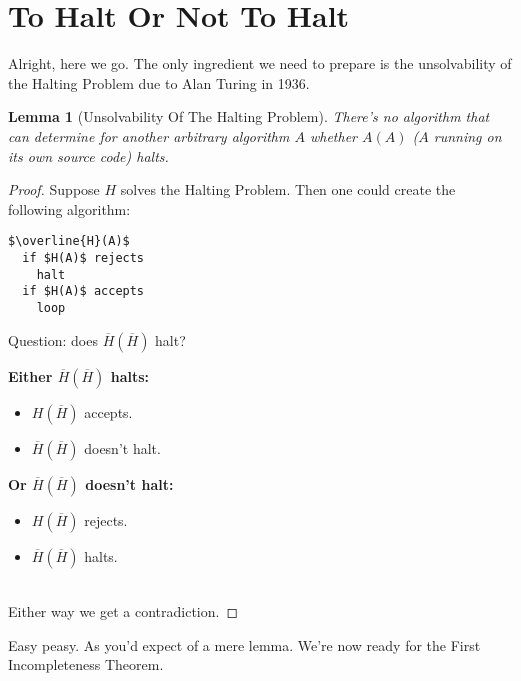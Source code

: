 \documentclass{article}
\theoremstyle{theorem}
\newtheorem{lemma}{Lemma}
\newcommand{\nameditem}[1]{\item\textbf{#1}}
\newcommand{\impl}{\item[$\Rightarrow$]}
\begin{document}
\section{To Halt Or Not To Halt}

Alright, here we go. The only ingredient we need to prepare is the unsolvability of the Halting Problem due to Alan Turing in 1936.

\begin{lemma}[Unsolvability Of The Halting Problem]
There's no algorithm that can determine for another arbitrary algorithm $A$ whether $A(A)$ ($A$ running on its own source code) halts.
\end{lemma}

\begin{proof}
Suppose $H$ solves the Halting Problem. Then one could create the following algorithm:\\[0.5em]
\begin{minipage}{\linewidth}
\begin{lstlisting}
$\overline{H}(A)$
  if $H(A)$ rejects
    halt
  if $H(A)$ accepts
    loop
\end{lstlisting}
\end{minipage}
Question: does $\overline{H}(\overline{H})$ halt?\\[0.5em]
\begin{minipage}{0.5\textwidth}
\begin{description}[noitemsep]
\nameditem{Either $\overline{H}(\overline{H})$ halts:} 
\begin{itemize}[noitemsep]
\impl $H(\overline{H})$ accepts.
\impl $\overline{H}(\overline{H})$ doesn't halt. \lightning
\end{itemize}
\end{description}
\end{minipage}
\begin{minipage}{0.5\textwidth}
\begin{description}[noitemsep]
\nameditem{Or $\overline{H}(\overline{H})$ doesn't halt:} 
\begin{itemize}[noitemsep]
\impl $H(\overline{H})$ rejects.
\impl $\overline{H}(\overline{H})$ halts. \lightning
\end{itemize}
\end{description}
\end{minipage}\\[1em]
Either way we get a contradiction.
\end{proof}

Easy peasy. As you'd expect of a mere lemma. We're now ready for the First Incompleteness Theorem.
\end{document}
